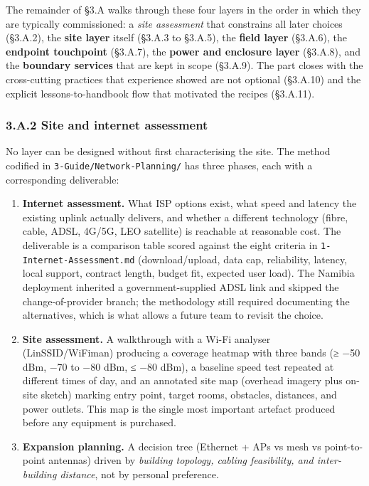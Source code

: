 The remainder of §3.A walks through these four layers in the order in
which they are typically commissioned: a \emph{site assessment} that
constrains all later choices (§3.A.2), the \textbf{site layer} itself
(§3.A.3 to §3.A.5), the \textbf{field layer} (§3.A.6), the
\textbf{endpoint touchpoint} (§3.A.7), the \textbf{power and enclosure
layer} (§3.A.8), and the \textbf{boundary services} that are kept in
scope (§3.A.9). The part closes with the cross-cutting practices that
experience showed are not optional (§3.A.10) and the explicit
lessons-to-handbook flow that motivated the recipes (§3.A.11).

\hypertarget{a.2-site-and-internet-assessment}{%
\subsubsection{3.A.2 Site and internet
assessment}\label{a.2-site-and-internet-assessment}}

No layer can be designed without first characterising the site. The
method codified in \texttt{3-Guide/Network-Planning/} has three phases,
each with a corresponding deliverable:

\begin{enumerate}
\def\labelenumi{\arabic{enumi}.}
\tightlist
\item
  \textbf{Internet assessment.} What ISP options exist, what speed and
  latency the existing uplink actually delivers, and whether a different
  technology (fibre, cable, ADSL, 4G/5G, LEO satellite) is reachable at
  reasonable cost. The deliverable is a comparison table scored against
  the eight criteria in \texttt{1-Internet-Assessment.md}
  (download/upload, data cap, reliability, latency, local support,
  contract length, budget fit, expected user load). The Namibia
  deployment inherited a government-supplied ADSL link and skipped the
  change-of-provider branch; the methodology still required documenting
  the alternatives, which is what allows a future team to revisit the
  choice.
\item
  \textbf{Site assessment.} A walkthrough with a Wi-Fi analyser
  (LinSSID/WiFiman) producing a coverage heatmap with three bands (≥ −50
  dBm, −70 to −80 dBm, ≤ −80 dBm), a baseline speed test repeated at
  different times of day, and an annotated site map (overhead imagery
  plus on-site sketch) marking entry point, target rooms, obstacles,
  distances, and power outlets. This map is the single most important
  artefact produced before any equipment is purchased.
\item
  \textbf{Expansion planning.} A decision tree (Ethernet + APs vs mesh
  vs point-to-point antennas) driven by \emph{building topology, cabling
  feasibility, and inter-building distance}, not by personal preference.
\end{enumerate}


